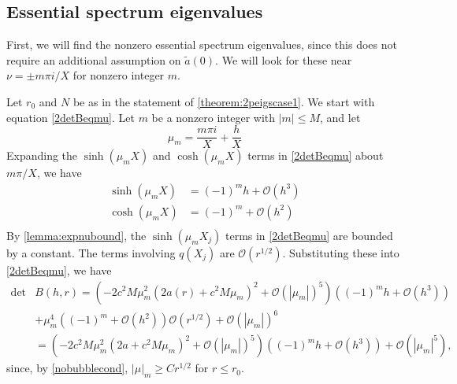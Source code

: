 \documentclass[thesis.tex]{subfiles}
\begin{document}
\subsection{Essential spectrum eigenvalues}

First, we will find the nonzero essential spectrum eigenvalues, since this does not require an additional assumption on $\tilde{a}(0)$. We will look for these near $\nu = \pm m \pi i/X$ for nonzero integer $m$.

Let $r_0$ and $N$ be as in the statement of \cref{theorem:2peigscase1}. We start with equation \cref{2detBeqmu}. Let $m$ be a nonzero integer with $|m| \leq M$, and let
\[
\mu_m = \frac{m \pi i}{X} + \frac{h}{X}
\]
Expanding the $\sinh(\mu_m X)$ and $\cosh(\mu_m X)$ terms in \cref{2detBeqmu} about $m \pi/X$, we have
\begin{align*}
\sinh(\mu_m X) &= (-1)^m h + \mathcal{O}(h^3) \\
\cosh(\mu_m X) &= (-1)^m + \mathcal{O}(h^2) \\
\end{align*}
By \cref{lemma:expnubound}, the $\sinh(\mu_m X_j)$ terms in \cref{2detBeqmu} are bounded by a constant. The terms involving $q(X_j)$ are $\mathcal{O}(r^{1/2})$. Substituting these into \cref{2detBeqmu}, we have 
\begin{equation}\label{Bess1}
\begin{aligned}
\det &B(h, r) = \left(-2 c^2 M  \mu_m^2 \left( 2a(r) + c^2 M \mu_m \right)^2 + \mathcal{O}( |\mu_m|)^5 \right) \left( (-1)^m h + \mathcal{O}(h^3) \right) \\
&+ \mu_m^4 \left( (-1)^m + \mathcal{O}(h^2)\right)\mathcal{O}(r^{1/2}) + \mathcal{O}\left( |\mu_m| \right)^6 \\
&= \left(-2 c^2 M  \mu_m^2 \left( 2a + c^2 M \mu_m \right)^2 + \mathcal{O}( |\mu_m|)^5 \right) \left( (-1)^m h + \mathcal{O}(h^3) \right) + \mathcal{O}\left( |\mu_m|^5 \right),
\end{aligned}
\end{equation}
since, by \cref{nobubblecond}, $|\mu|_m \geq C r^{1/2}$ for $r \leq r_0$.
\end{document}
